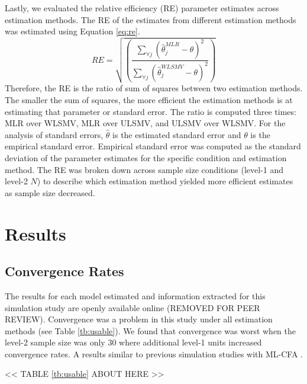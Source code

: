 \documentclass[Review,sageh,times, doublespace]{sagej}
\begin{document}
Lastly, we evaluated the relative efficiency (RE) parameter estimates across estimation methods.
The RE of the estimates from different estimation methods was estimated using Equation \ref{eq:re}.
\begin{equation}\label{eq:re}
RE = \sqrt{\left( \frac{\sum_{\forall j}\left(\hat{\theta}_j^{MLR} -\theta\right)^2 }{\sum_{\forall j}\left(\hat{\theta}_j^{WLSMV} -\theta\right)^2 }\right)}
\end{equation}
Therefore, the RE is the ratio of sum of squares between two estimation methods. 
The smaller the sum of squares, the more efficient the estimation methods is at estimating that parameter or standard error.
The ratio is computed three times: MLR over WLSMV, MLR over ULSMV, and ULSMV over WLSMV.
For the analysis of standard errors, $\hat{\theta}$ is the estimated standard error and $\theta$ is the empirical standard error.
Empirical standard error was computed as the standard deviation of the parameter estimates for the specific condition and estimation method.
The RE was broken down across sample size conditions (level-1 and level-2 $N$) to describe which estimation method yielded more efficient estimates as sample size decreased.

\section{Results}

\subsection{Convergence Rates}

The results for each model estimated and information extracted for this simulation study are openly available online (REMOVED FOR PEER REVIEW). %
Convergence was a problem in this study under all estimation methods (see Table \ref{tb:usable}).
We found that convergence was worst when the level-2 sample size was only 30 where additional level-1 units increased convergence rates.
A results similar to previous simulation studies with ML-CFA \citep{Depaoli2015}.

<< TABLE \ref{tb:usable} ABOUT HERE >>
\end{document}
